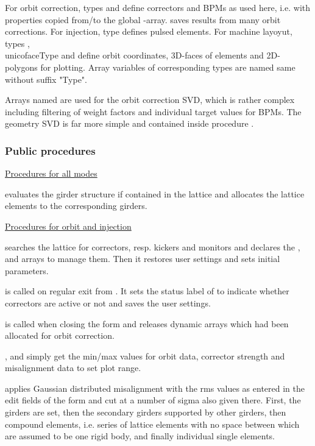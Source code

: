 \documentclass[12pt]{article}
\newcommand\code[1]{{\tt #1}}
\newcommand{\unico}[1]{{\color{burntorange}\code{#1}}}
\newcommand{\opagui}[1]{\colorbox{blue!20}{{\color{black}\code{#1}}}}
\newcommand{\ogui}[1]{\hyperref[#1]{\opagui{#1}}}
\newcommand{\ppro}[1]{\subsubsection*{Public procedures} #1}
\begin{document}
For orbit correction, types \unico{cortype} and \unico{bpmtype} define correctors and BPMs as used here, i.e. with properties copied from/to the global \unico{Ella}-array. \unico{OrbLoopType} saves results from many orbit corrections. For injection, type \unico{kicktype} defines pulsed elements. For machine layoyut, types \unico{midpt}, \\unico{faceType} and \unico{fpolytype} define orbit coordinates, 3D-faces of elements and 2D-polygons for plotting. Array variables of corresponding types are named same without suffix "Type".

Arrays named \unico{oco\dots} are used for the orbit correction SVD, which is rather complex including filtering of weight factors and individual target values for BPMs. The geometry SVD is far more simple and contained inside procedure \unico{gmat\_step}.


\ppro{}

\underline{Procedures for all modes}

\unico{GirderSetup} evaluates the girder structure if contained in the lattice and allocates the lattice elements to the corresponding girders.

\underline{Procedures for orbit and injection}

\unico{OrbitInit} searches the lattice for correctors, resp. kickers and monitors and declares the \unico{cor}, \unico{bpm} and \unico{kick} arrays to manage them. Then it restores user settings and sets initial parameters.

\unico{OrbitExit} is called on regular exit from \ogui{opaorbit}. It sets the status label of \ogui{opamenu} to indicate whether correctors are active or not and saves the user settings.

\unico{OrbitClose} is called when closing the \ogui{opaorbit} form and releases dynamic arrays which had been allocated for orbit correction.


\unico{GetOrbitMax}, \unico{GetCorMax} and \unico{GetMisMax} simply get the min/max values for orbit data, corrector strength and misalignment data to set plot range.

\unico{setMisalignments} applies Gaussian distributed misalignment with the rms values as entered in the edit fields of the \ogui{opaorbit} form and cut at a number of sigma also given there. First, the girders are set, then the secondary girders supported by other girders, then compound elements, i.e. series of lattice elements with no space between which are assumed to be one rigid body, and finally individual single elements.
\end{document}
